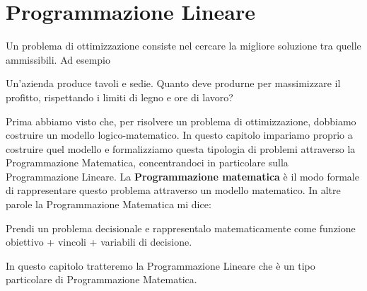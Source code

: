 \chapter{Programmazione Lineare}
Un problema di ottimizzazione consiste nel cercare la migliore soluzione tra quelle ammissibili.
Ad esempio
\begin{center}
    Un'azienda produce tavoli e sedie. Quanto deve produrne per massimizzare il profitto, rispettando i limiti di legno e ore di lavoro?
\end{center}
Prima abbiamo visto che, per risolvere un problema di ottimizzazione, dobbiamo costruire un modello logico-matematico. In questo capitolo impariamo proprio a costruire quel modello e formalizziamo questa tipologia di problemi attraverso la Programmazione Matematica, concentrandoci in particolare sulla Programmazione Lineare.
La \textbf{Programmazione matematica} è il modo formale di rappresentare questo problema attraverso un modello matematico.
In altre parole la Programmazione Matematica mi dice:
\begin{center}
    Prendi un problema decisionale e rappresentalo matematicamente come funzione obiettivo + vincoli + variabili di decisione.
\end{center}
In questo capitolo tratteremo la Programmazione Lineare che è un tipo particolare di Programmazione Matematica.
